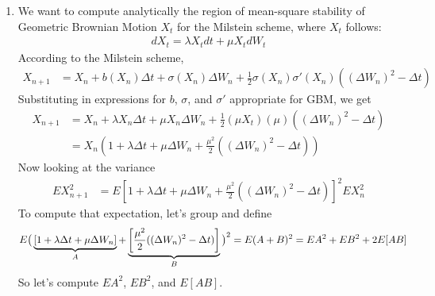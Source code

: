 \documentclass[12pt]{article}
\theoremstyle{plain}
\theoremstyle{definition}
\theoremstyle{remark}
\begin{document}
\begin{enumerate}
  \clearpage
  \item %
    We want to compute analytically the region of mean-square stability
    of Geometric Brownian Motion $X_t$ for the Milstein scheme, where
    $X_t$ follows:
    \begin{align*}
      dX_t = \lambda X_t dt + \mu X_t dW_t
    \end{align*}
    According to the Milstein scheme,
    \begin{align*}
      X_{n+1} &=
        X_n + b(X_n)\Delta t + \sigma(X_n) \Delta W_n
        + \frac{1}{2}\sigma(X_n) \sigma'(X_n) ( (\Delta W_n)^2-\Delta t)
    \end{align*}
    Substituting in expressions for $b$, $\sigma$, and $\sigma'$
    appropriate for GBM, we get
    \begin{align*}
      X_{n+1} &=
        X_n + \lambda X_n \Delta t + \mu X_n \Delta W_n
        + \frac{1}{2}(\mu X_t) (\mu) ( (\Delta W_n)^2-\Delta t)\\
      &=
        X_n\left(1 + \lambda \Delta t + \mu \Delta W_n
        + \frac{\mu^2}{2} ((\Delta W_n)^2-\Delta t)\right)
    \end{align*}
    Now looking at the variance
    \begin{align*}
      EX_{n+1}^2
      &=
        E\left[ 1 + \lambda \Delta t + \mu \Delta W_n
        + \frac{\mu^2}{2} ((\Delta W_n)^2-\Delta t)\right]^2 EX_n^2
    \end{align*}
    To compute that expectation, let's group and define
    \begin{align*}
        E\big(
          \underbrace{%
            \left[ 1 + \lambda \Delta t + \mu \Delta W_n\right]
          }_{A}
        + \underbrace{%
            \left[\frac{\mu^2}{2} ((\Delta W_n)^2-\Delta t)\right]
          }_{B}
        \big)^2
        &= E(A+B)^2 = EA^2 + EB^2 + 2E[AB]
    \end{align*}
    So let's compute $EA^2$, $EB^2$, and $E[AB]$.


\end{enumerate}
\end{document}
